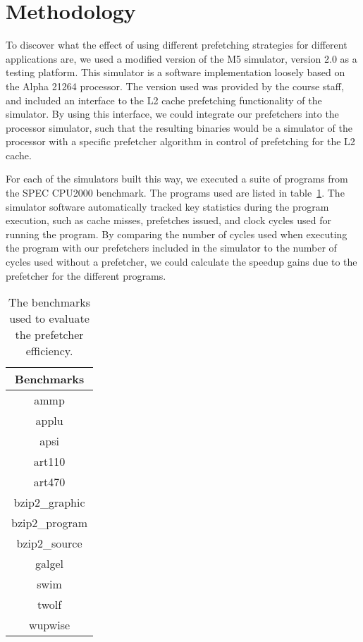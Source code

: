 
\section{Methodology}
\label{sec:methodology}

To discover what the effect of using different prefetching strategies
for different applications are, we used a modified version of the M5
simulator, version 2.0\cite{M5} as a testing platform. This simulator
is a software implementation loosely based on the Alpha 21264
processor\cite{Alpha}. The version used was provided by the course
staff, and included an interface to the L2 cache prefetching
functionality of the simulator. By using this interface, we could
integrate our prefetchers into the processor simulator, such that the
resulting binaries would be a simulator of the processor with a
specific prefetcher algorithm in control of prefetching for the L2 cache.

For each of the simulators built this way, we executed a suite of
programs from the SPEC CPU2000 benchmark. The programs used are listed
in table~\ref{tab:benchmarks}. The simulator software automatically
tracked key statistics during the program execution, such as cache
misses, prefetches issued, and clock cycles used for running the
program. By comparing the number of cycles used when executing the
program with our prefetchers included in the simulator to the number
of cycles used without a prefetcher, we could calculate the speedup
gains due to the prefetcher for the different programs.

\begin{table}[htbp]
  \centering
  \begin{tabular}{|c|}
    \hline
    {\bf Benchmarks} \\ \hline
    ammp \\ \hline
    applu \\ \hline
    apsi \\ \hline
    art110 \\ \hline
    art470 \\ \hline
    bzip2\_graphic \\ \hline
    bzip2\_program \\ \hline
    bzip2\_source \\ \hline
    galgel \\ \hline
    swim \\ \hline
    twolf \\ \hline
    wupwise \\ \hline
  \end{tabular}
  \caption{The benchmarks used to evaluate the prefetcher efficiency.}
  \label{tab:benchmarks}
\end{table}


